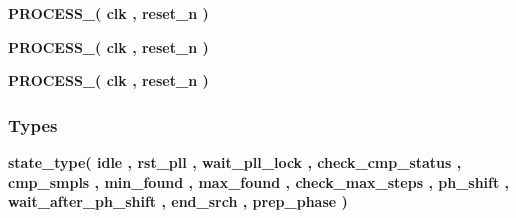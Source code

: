 \begin{DoxyCompactItemize}
\item 
{\bf P\+R\+O\+C\+E\+S\+S\+\_}{\bfseries  ( {\bfseries {\bfseries {\bf clk}} \textcolor{vhdlchar}{ }} , {\bfseries {\bfseries {\bf reset\+\_\+n}} \textcolor{vhdlchar}{ }} )}
\item 
{\bf P\+R\+O\+C\+E\+S\+S\+\_}{\bfseries  ( {\bfseries {\bfseries {\bf clk}} \textcolor{vhdlchar}{ }} , {\bfseries {\bfseries {\bf reset\+\_\+n}} \textcolor{vhdlchar}{ }} )}
\item 
{\bf P\+R\+O\+C\+E\+S\+S\+\_}{\bfseries  ( {\bfseries {\bfseries {\bf clk}} \textcolor{vhdlchar}{ }} , {\bfseries {\bfseries {\bf reset\+\_\+n}} \textcolor{vhdlchar}{ }} )}
\end{DoxyCompactItemize}
\subsubsection*{Types}
 \begin{DoxyCompactItemize}
\item 
{\bfseries {\bf state\+\_\+type}{\bfseries \textcolor{vhdlchar}{(}\textcolor{vhdlchar}{ }\textcolor{vhdlchar}{idle}\textcolor{vhdlchar}{ }\textcolor{vhdlchar}{,}\textcolor{vhdlchar}{ }\textcolor{vhdlchar}{rst\+\_\+pll}\textcolor{vhdlchar}{ }\textcolor{vhdlchar}{,}\textcolor{vhdlchar}{ }\textcolor{vhdlchar}{wait\+\_\+pll\+\_\+lock}\textcolor{vhdlchar}{ }\textcolor{vhdlchar}{,}\textcolor{vhdlchar}{ }\textcolor{vhdlchar}{check\+\_\+cmp\+\_\+status}\textcolor{vhdlchar}{ }\textcolor{vhdlchar}{,}\textcolor{vhdlchar}{ }\textcolor{vhdlchar}{cmp\+\_\+smpls}\textcolor{vhdlchar}{ }\textcolor{vhdlchar}{,}\textcolor{vhdlchar}{ }\textcolor{vhdlchar}{min\+\_\+found}\textcolor{vhdlchar}{ }\textcolor{vhdlchar}{,}\textcolor{vhdlchar}{ }\textcolor{vhdlchar}{max\+\_\+found}\textcolor{vhdlchar}{ }\textcolor{vhdlchar}{,}\textcolor{vhdlchar}{ }\textcolor{vhdlchar}{check\+\_\+max\+\_\+steps}\textcolor{vhdlchar}{ }\textcolor{vhdlchar}{,}\textcolor{vhdlchar}{ }\textcolor{vhdlchar}{ph\+\_\+shift}\textcolor{vhdlchar}{ }\textcolor{vhdlchar}{,}\textcolor{vhdlchar}{ }\textcolor{vhdlchar}{wait\+\_\+after\+\_\+ph\+\_\+shift}\textcolor{vhdlchar}{ }\textcolor{vhdlchar}{,}\textcolor{vhdlchar}{ }\textcolor{vhdlchar}{end\+\_\+srch}\textcolor{vhdlchar}{ }\textcolor{vhdlchar}{,}\textcolor{vhdlchar}{ }\textcolor{vhdlchar}{prep\+\_\+phase}\textcolor{vhdlchar}{ }\textcolor{vhdlchar}{)}\textcolor{vhdlchar}{ }}} 
\end{DoxyCompactItemize}
